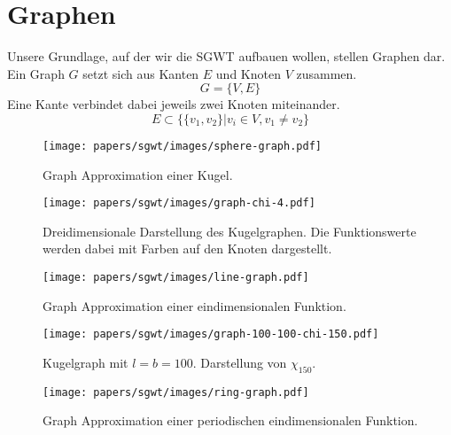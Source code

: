 
\section{Graphen\label{sec:sgwt:graphs}}

Unsere Grundlage, auf der wir die SGWT aufbauen wollen, stellen Graphen dar. 
Ein Graph $G$ setzt sich aus Kanten $E$ und Knoten $V$ zusammen.
\begin{equation*}
G = \{V, E\}
\end{equation*}
Eine Kante verbindet dabei jeweils zwei Knoten miteinander.
\begin{equation*}
E \subset \{\{v_1, v_2\} | v_i \in V, v_1 \neq v_2 \}
\end{equation*}

\begin{figure}
    \centering
    \texttt{[image: papers/sgwt/images/sphere-graph.pdf]}
    \caption{Graph Approximation einer Kugel.
    \label{fig:sgwt:sphere:graph}}
\end{figure}

\begin{figure}
    \centering
    \texttt{[image: papers/sgwt/images/graph-chi-4.pdf]}
    \vspace{-80pt}
    \caption{Dreidimensionale Darstellung des Kugelgraphen. Die Funktionswerte 
    werden dabei mit Farben auf den Knoten dargestellt. 
    \label{fig:sgwt:sphere:graph:chi}}
\end{figure}

\begin{figure}
    \centering
    \texttt{[image: papers/sgwt/images/line-graph.pdf]}
    \vspace{-200pt}
    \caption{Graph Approximation einer eindimensionalen Funktion. 
    \label{fig:sgwt:line:graph}}
\end{figure}

\begin{figure}
    \centering
    \texttt{[image: papers/sgwt/images/graph-100-100-chi-150.pdf]}
    \vspace{-80pt}
    \caption{Kugelgraph mit $l = b = 100$. Darstellung von $\chi_{150}$.
    \label{fig:sgwt:sphere:graph:chi:hh}}
\end{figure}

\begin{figure}
    \centering
    \texttt{[image: papers/sgwt/images/ring-graph.pdf]}
    \caption{Graph Approximation einer periodischen eindimensionalen Funktion. 
    \label{fig:sgwt:ring:graph}}
\end{figure}

